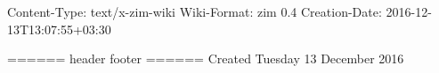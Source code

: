 Content-Type: text/x-zim-wiki
Wiki-Format: zim 0.4
Creation-Date: 2016-12-13T13:07:55+03:30

====== header footer ======
Created Tuesday 13 December 2016

\usepackage{fancyhdr}
 
\pagestyle{fancy}
\fancyhf{}
\cfoot{}
